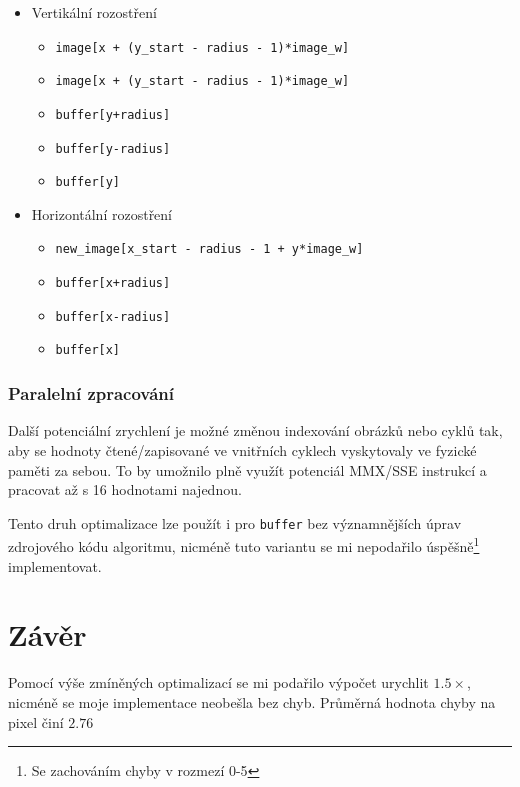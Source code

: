\documentclass[12pt,a4paper,titlepage,final]{article}
\begin{document}
			\begin{itemize}
				\item Vertikální rozostření
					\begin{itemize}
						\item \begin{verbatim}image[x + (y_start - radius - 1)*image_w]\end{verbatim}
						\item \begin{verbatim}image[x + (y_start - radius - 1)*image_w]\end{verbatim}
						\item \begin{verbatim}buffer[y+radius]\end{verbatim}
						\item \begin{verbatim}buffer[y-radius]\end{verbatim}
						\item \begin{verbatim}buffer[y]\end{verbatim}
					\end{itemize}
				\item Horizontální rozostření
					\begin{itemize}
						\item \begin{verbatim}new_image[x_start - radius - 1 + y*image_w]\end{verbatim}
						\item \begin{verbatim}buffer[x+radius]\end{verbatim}
						\item \begin{verbatim}buffer[x-radius]\end{verbatim}
						\item \begin{verbatim}buffer[x]\end{verbatim}
					\end{itemize}
			\end{itemize}

		\subsubsection{Paralelní zpracování}
			Další potenciální zrychlení je možné změnou indexování obrázků nebo cyklů tak,
			aby se hodnoty čtené/zapisované ve vnitřních cyklech vyskytovaly ve fyzické paměti za sebou.
			To by umožnilo plně využít potenciál MMX/SSE instrukcí a pracovat až s 16 hodnotami najednou.

			Tento druh optimalizace lze použít i pro \texttt{buffer} bez významnějších úprav
			zdrojového kódu algoritmu, nicméně tuto variantu se mi nepodařilo úspěšně\footnote{Se zachováním chyby v rozmezí 0-5}  implementovat.


\section{Závěr}
	Pomocí výše zmíněných optimalizací se mi podařilo výpočet urychlit $1.5\times$, nicméně se
	moje implementace neobešla bez chyb. Průměrná hodnota chyby na pixel činí $2.76$
\end{document}
